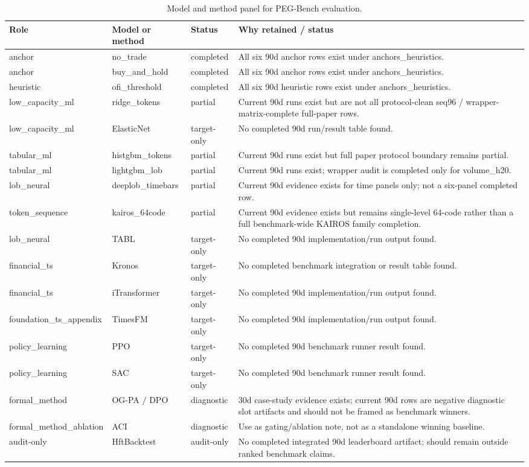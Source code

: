 \begin{table}[t]
\centering
\caption{Model and method panel for PEG-Bench evaluation.}
\label{tab:table_28_method_panel}
\begin{tabular}{llll}
\toprule
Role & Model or method & Status & Why retained / status \\
\midrule
anchor & no\_trade & completed & All six 90d anchor rows exist under anchors\_heuristics. \\
anchor & buy\_and\_hold & completed & All six 90d anchor rows exist under anchors\_heuristics. \\
heuristic & ofi\_threshold & completed & All six 90d heuristic rows exist under anchors\_heuristics. \\
low\_capacity\_ml & ridge\_tokens & partial & Current 90d runs exist but are not all protocol-clean seq96 / wrapper-matrix-complete full-paper rows. \\
low\_capacity\_ml & ElasticNet & target-only & No completed 90d run/result table found. \\
tabular\_ml & histgbm\_tokens & partial & Current 90d runs exist but full paper protocol boundary remains partial. \\
tabular\_ml & lightgbm\_lob & partial & Current 90d runs exist; wrapper audit is completed only for volume\_h20. \\
lob\_neural & deeplob\_timebars & partial & Current 90d evidence exists for time panels only; not a six-panel completed row. \\
token\_sequence & kairos\_64code & partial & Current 90d evidence exists but remains single-level 64-code rather than a full benchmark-wide KAIROS family completion. \\
lob\_neural & TABL & target-only & No completed 90d implementation/run output found. \\
financial\_ts & Kronos & target-only & No completed benchmark integration or result table found. \\
financial\_ts & iTransformer & target-only & No completed 90d implementation/run output found. \\
foundation\_ts\_appendix & TimesFM & target-only & No completed 90d implementation/run output found. \\
policy\_learning & PPO & target-only & No completed 90d benchmark runner result found. \\
policy\_learning & SAC & target-only & No completed 90d benchmark runner result found. \\
formal\_method & OG-PA / DPO & diagnostic & 30d case-study evidence exists; current 90d rows are negative diagnostic slot artifacts and should not be framed as benchmark winners. \\
formal\_method\_ablation & ACI & diagnostic & Use as gating/ablation note, not as a standalone winning baseline. \\
audit-only & HftBacktest & audit-only & No completed integrated 90d leaderboard artifact; should remain outside ranked benchmark claims. \\
\bottomrule
\end{tabular}
\end{table}
